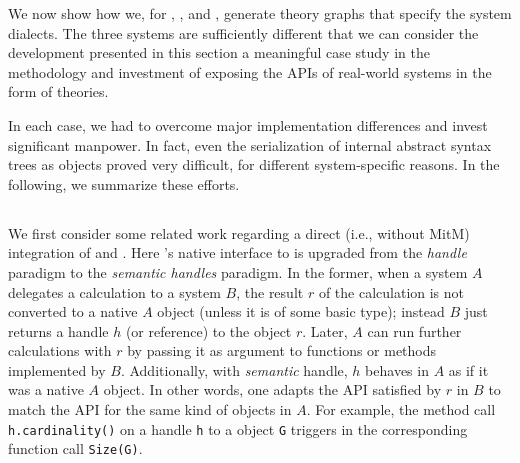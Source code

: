 We now show how we, for \GAP, \Singular, and \Sage, generate theory graphs that specify the system dialects.
The three systems are sufficiently different that we can consider the development presented in this section a meaningful case study in the methodology and investment of exposing the APIs of real-world systems in the form of \OMMT theories.

In each case, we had to overcome major implementation differences and invest significant manpower.
In fact, even the serialization of internal abstract syntax trees as
\OMMT objects proved very difficult, for different system-specific reasons.
In the following, we summarize these efforts.

\subsection{\Sage}

We first consider some related work \cite{DehKohKon:iop16} regarding a direct (i.e., without MitM) integration of \Sage and \GAP.
Here \Sage's native interface to \GAP is upgraded from the \emph{handle} paradigm to the \emph{semantic handles} paradigm.
In the former, when a system $A$ delegates a calculation to a system $B$, the result $r$ of the calculation is not converted to a native $A$ object (unless it is of some basic type); instead $B$ just returns a handle $h$ (or reference) to the object $r$.
Later, $A$ can run further calculations with $r$ by passing it as argument to functions or methods implemented by $B$.
Additionally, with \emph{semantic} handle, $h$ behaves in $A$ as if it was a native $A$ object.
In other words, one adapts the API satisfied by $r$ in $B$ to match the API for the same kind of objects in $A$.
For example, the method call \texttt{h.cardinality()} on a \Sage handle \texttt{h} to a \GAP object \texttt{G} triggers in \GAP the corresponding function call \texttt{Size(G)}. 


